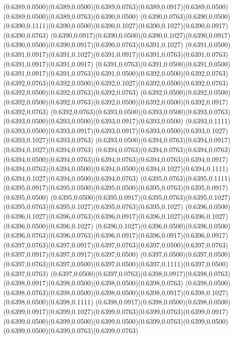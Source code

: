 (0.6389,0.0500)(0.6389,0.0500)(0.6389,0.0763)(0.6389,0.0917)(0.6389,0.0500)(0.6389,0.0500)(0.6389,0.0763)(0.6390,0.0500)
(0.6390,0.0763)(0.6390,0.0500)(0.6390,0.1111)(0.6390,0.0500)(0.6390,0.1027)(0.6390,0.1027)(0.6390,0.0917)(0.6390,0.0763)
(0.6390,0.0917)(0.6390,0.0500)(0.6390,0.1027)(0.6390,0.0917)(0.6390,0.0500)(0.6390,0.0917)(0.6390,0.0763)(0.6391,0.1027)
(0.6391,0.0500)(0.6391,0.0917)(0.6391,0.1027)(0.6391,0.0917)(0.6391,0.0763)(0.6391,0.0763)(0.6391,0.0917)(0.6391,0.0917)
(0.6391,0.0763)(0.6391,0.0500)(0.6391,0.0500)(0.6391,0.0917)(0.6391,0.0763)(0.6391,0.0500)(0.6392,0.0500)(0.6392,0.0763)
(0.6392,0.0763)(0.6392,0.0500)(0.6392,0.1027)(0.6392,0.0500)(0.6392,0.0763)(0.6392,0.0500)(0.6392,0.0763)(0.6392,0.0763)
(0.6392,0.0500)(0.6392,0.0500)(0.6392,0.0500)(0.6392,0.0763)(0.6392,0.0500)(0.6392,0.0500)(0.6392,0.0917)(0.6392,0.0763)
(0.6392,0.0763)(0.6393,0.0500)(0.6393,0.0500)(0.6393,0.0763)(0.6393,0.0500)(0.6393,0.0500)(0.6393,0.0917)(0.6393,0.0500)
(0.6393,0.1111)(0.6393,0.0500)(0.6393,0.0917)(0.6393,0.0917)(0.6393,0.0500)(0.6393,0.1027)(0.6393,0.1027)(0.6393,0.0763)
(0.6393,0.0500)(0.6394,0.0763)(0.6394,0.0917)(0.6394,0.1027)(0.6394,0.0763)
\PST@Solid(0.6394,0.0763)(0.6394,0.0763)(0.6394,0.0763)(0.6394,0.0500)(0.6394,0.0763)(0.6394,0.0763)(0.6394,0.0763)(0.6394,0.0917)
(0.6394,0.0763)(0.6394,0.0500)(0.6394,0.0500)(0.6394,0.1027)(0.6394,0.1111)(0.6394,0.1027)(0.6394,0.0500)(0.6394,0.0763)
(0.6395,0.0763)(0.6395,0.1111)(0.6395,0.0917)(0.6395,0.0500)(0.6395,0.0500)(0.6395,0.0763)(0.6395,0.0917)(0.6395,0.0500)
(0.6395,0.0500)(0.6395,0.0917)(0.6395,0.0763)(0.6395,0.1027)(0.6395,0.0763)(0.6395,0.1027)(0.6395,0.0763)(0.6395,0.1027)
(0.6396,0.0500)(0.6396,0.1027)(0.6396,0.0763)(0.6396,0.0917)(0.6396,0.1027)(0.6396,0.1027)(0.6396,0.0500)(0.6396,0.1027)
(0.6396,0.1027)(0.6396,0.0500)(0.6396,0.0500)(0.6396,0.0763)(0.6396,0.0763)(0.6396,0.0917)(0.6396,0.0917)(0.6396,0.0917)
(0.6397,0.0763)(0.6397,0.0917)(0.6397,0.0763)(0.6397,0.0500)(0.6397,0.0763)(0.6397,0.0917)(0.6397,0.0917)(0.6397,0.0500)
(0.6397,0.0500)(0.6397,0.0500)(0.6397,0.0763)(0.6397,0.0500)(0.6397,0.0500)(0.6397,0.1111)(0.6397,0.0500)(0.6397,0.0763)
(0.6397,0.0500)(0.6397,0.0763)(0.6398,0.0917)(0.6398,0.0763)(0.6398,0.0917)(0.6398,0.0500)(0.6398,0.0500)(0.6398,0.0763)
(0.6398,0.0500)(0.6398,0.0763)(0.6398,0.0500)(0.6398,0.0500)(0.6398,0.0917)(0.6398,0.1027)(0.6398,0.0500)(0.6398,0.1111)
(0.6398,0.0917)(0.6398,0.0500)(0.6398,0.0500)(0.6399,0.0917)(0.6399,0.1027)(0.6399,0.0763)(0.6399,0.0763)(0.6399,0.0917)
(0.6399,0.0500)(0.6399,0.0500)(0.6399,0.0500)(0.6399,0.0763)(0.6399,0.0500)(0.6399,0.0500)(0.6399,0.0763)(0.6399,0.0763)
